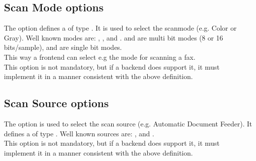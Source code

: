 \documentclass[11pt,DVIps]{report}
\begin{document}
\subsection{Scan Mode options}
\begin{changebar}
The option  defines a 
of type .
It is used to select the scanmode (e.g. Color or Gray).
Well known modes are: , , 
and .  and  are multi bit
modes (8 or 16 bits/sample),  and 
are single bit modes.\\
This way a frontend can select e.g the mode 
for scanning a fax.\\
 
This option is not mandatory, but if a backend does support it, it
must implement it in a manner consistent with the above definition.\\
\end{changebar}
 
\subsection{Scan Source options}
\begin{changebar}
The option  is used to select the scan source
(e.g. Automatic Document Feeder).
It defines a 
of type .
Well known sources are: ,  and
.\\
 
This option is not mandatory, but if a backend does support it, it
must implement it in a manner consistent with the above definition.\\
\end{changebar}
\end{document}
